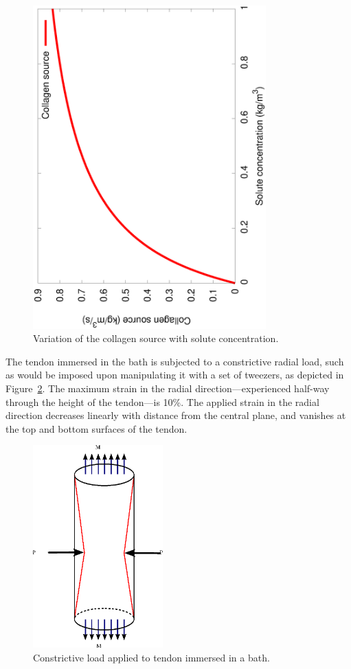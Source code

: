 \begin{figure}[!hpt]
  \centering
  \includegraphics[angle=270,width=0.8\textwidth]{images/elucidation/enzyme-kinetics}
  \caption{Variation of the collagen source with solute
    concentration.}
  \label{eg3menten}
\end{figure}

The tendon immersed in the bath is subjected to a constrictive radial
load, such as would be imposed upon manipulating it with a set of
tweezers, as depicted in Figure~\ref{constrictload}. The maximum
strain in the radial direction---experienced half-way through the
height of the tendon---is 10\%. The applied strain in the radial
direction decreases linearly with distance from the central plane, and
vanishes at the top and bottom surfaces of the tendon.


\begin{figure}[!hpt]
  \centering
  \includegraphics[width=5.0cm]{images/examples/lagrangian/constriction/cylinder-in-bath}
  \caption{Constrictive load applied to tendon immersed in a bath.}
  \label{constrictload}
\end{figure}


